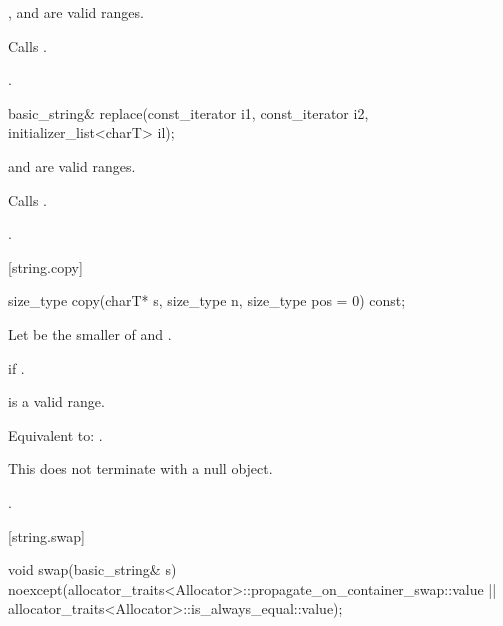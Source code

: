 \begin{itemdescr}
\pnum
\requires {},  and  are valid ranges.

\pnum
\effects Calls .

\pnum
\returns
{}.
\end{itemdescr}

%
\begin{itemdecl}
basic_string& replace(const_iterator i1, const_iterator i2,
                      initializer_list<charT> il);
\end{itemdecl}

\begin{itemdescr}
\pnum
\requires {} and  are valid ranges.

\pnum
\effects Calls .

\pnum
\returns
{}.
\end{itemdescr}


[string.copy]{}

%
\begin{itemdecl}
size_type copy(charT* s, size_type n, size_type pos = 0) const;
\end{itemdecl}

\begin{itemdescr}
\pnum
Let  be the smaller of  and .

\pnum
\throws
{}
if
.

\pnum
\requires
{} is a valid range.

\pnum
\effects
Equivalent to: .
\begin{note} This does not terminate  with a null object. \end{note} 

\pnum
\returns
{}.
\end{itemdescr}

[string.swap]{}

%
\begin{itemdecl}
void swap(basic_string& s)
  noexcept(allocator_traits<Allocator>::propagate_on_container_swap::value ||
           allocator_traits<Allocator>::is_always_equal::value);
\end{itemdecl}


